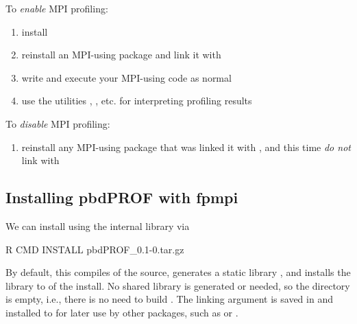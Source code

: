 To \emph{enable} MPI profiling:
\begin{enumerate}
  \item install 
  \item reinstall an MPI-using package and link it with 
  \item write and execute your MPI-using  code as normal
  \item use the  utilities , , etc. 
for interpreting profiling results
\end{enumerate}
To \emph{disable} MPI profiling:
\begin{enumerate}
  \item reinstall any MPI-using package that was linked it with , 
and this time \emph{do not} link with 
\end{enumerate}



% 


\subsection{Installing pbdPROF with fpmpi}
\label{sec:fpmpi}

We can install  using the internal  library via
\begin{Command}
R CMD INSTALL pbdPROF_0.1-0.tar.gz
\end{Command}
By default, this compiles  of the  source, 
generates a static library , and installs the library to
 of the  install. No shared library is generated 
or needed, so the directory
 is empty, i.e., there is no need to build .
The linking argument is saved in  and installed to
 for later use by other packages, such as  or .



